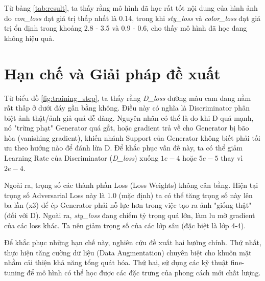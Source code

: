 Từ bảng \ref{tab:result}, ta thấy rằng mô hình đã học rất tốt nội dung của hình ảnh do \textit{con\_loss}
đạt giá trị thấp nhất là 0.14, trong khi \textit{sty\_loss} và \textit{color\_loss} 
đạt giá trị ổn định trong khoảng 2.8 - 3.5 và 0.9 - 0.6, cho thấy mô hình đã học đang không hiệu quả.

\section{Hạn chế và Giải pháp đề xuất}

Từ biểu đồ \ref{fig:training_step}, ta thấy rằng \textit{D\_loss} đường màu cam đang nằm rất thấp 
ở dưới đáy gần bằng không. Điều này có nghĩa là Discriminator phân biệt ảnh thật/ảnh giả quá dễ dàng.
Nguyên nhân có thể là do khi D quá mạnh, nó "trừng phạt" Generator quá gắt, hoặc gradient trả về cho 
Generator bị bão hòa (vanishing gradient), khiến nhánh Support của Generator không biết phải tối ưu 
theo hướng nào để đánh lừa D. Để khắc phục vấn đề này, ta có thể giảm Learning Rate của 
Discriminator (\textit{D\_loss}) xuống $1e-4$ hoặc $5e-5$ thay vì $2e-4$.

Ngoài ra, trọng số các thành phần Loss (Loss Weights) không cân bằng. Hiện tại trọng số Adversarial Loss này là 1.0 
(mặc định) ta có thể tăng trọng số này lên ba lần (x3) để ép Generator phải nỗ lực hơn trong việc tạo 
ra ảnh "giống thật" (đối với D). Ngoài ra, \textit{sty\_loss} đang chiếm tỷ trọng quá lớn, làm lu mờ 
gradient của các loss khác. Ta nên giảm trọng số của các lớp sâu (đặc biệt là lớp 4-4).

Để khắc phục những hạn chế này, nghiên cứu đề xuất hai hướng chính. Thứ nhất, 
thực hiện tăng cường dữ liệu (Data Augmentation) chuyên biệt cho khuôn mặt nhằm 
cải thiện khả năng tổng quát hóa. Thứ hai, sử dụng các kỹ thuật fine-tuning để mô hình có thể học được
các đặc trưng của phong cách mới chất lượng.

